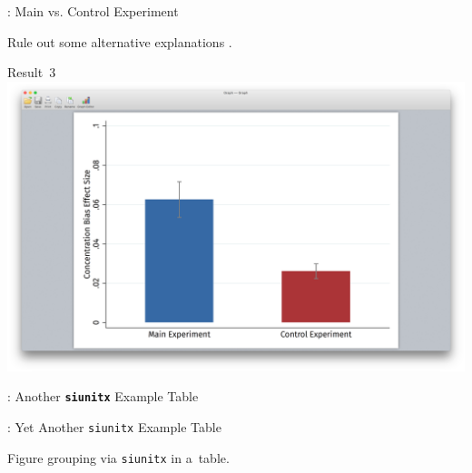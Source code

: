 \begin{frame}{\titleprefix: Main vs. Control Experiment}

	Rule out some alternative explanations \citep{Dertwinkel-Kalt2017}.

	\bigskip

	\centering
	{\small \alert{Result~3}} \\[15pt]
	\includegraphics[height=0.5\textheight, trim={3.75in 1.75in 3.75in 2in}, clip]
		{1_Example_Content/Images/average_main_control.png}

\end{frame}


\begin{frame}{\titleprefix: Another \textbf{\texttt{siunitx}} Example Table}

	\begin{table}
	\caption{%
		Example of a~regression table \citep[adapted from][]{Gerhardt2017}.
		Never forget to mention the dependent variable (here, $m_\sim$)!%
	}
	\label{tab:lin_reg_interactions}
	\resizebox*{!}{0.59\textheight}{%
		\mdseries\selectfont
		
	}
	\end{table}

\end{frame}


\begin{frame}{\titleprefix: Yet Another \texttt{siunitx} Example Table}

	\begin{table}
		\caption{Figure grouping via \texttt{siunitx} in a~table.}
		
	\end{table}

\end{frame}


